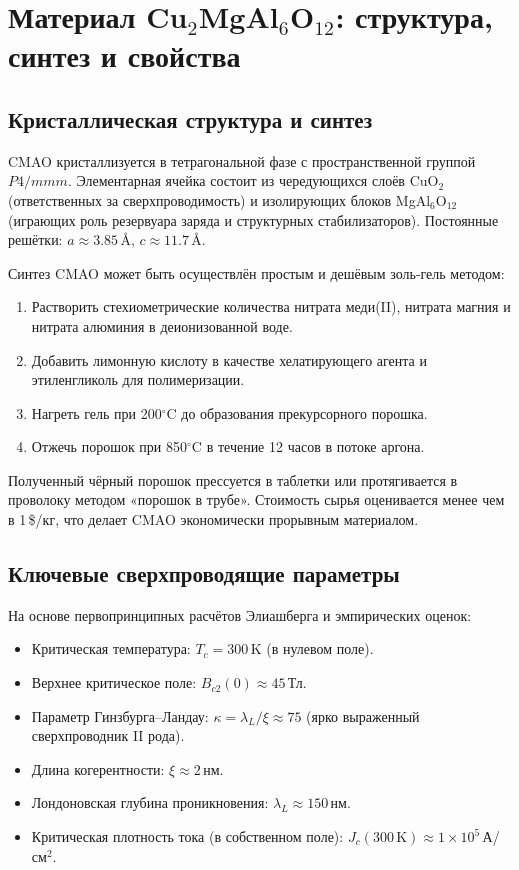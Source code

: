 \documentclass[12pt,a4paper]{article}
\numberwithin{equation}{section}
\begin{document}
\section{Материал Cu$_2$MgAl$_6$O$_{12}$: структура, синтез и свойства}
\label{sec:material}

\subsection{Кристаллическая структура и синтез}

CMAO кристаллизуется в тетрагональной фазе с пространственной группой $P4/mmm$. Элементарная ячейка состоит из чередующихся слоёв CuO$_2$ (ответственных за сверхпроводимость) и изолирующих блоков MgAl$_6$O$_{12}$ (играющих роль резервуара заряда и структурных стабилизаторов). Постоянные решётки: $a \approx 3.85$\,\AA, $c \approx 11.7$\,\AA.

Синтез CMAO может быть осуществлён простым и дешёвым золь-гель методом:
\begin{enumerate}
    \item Растворить стехиометрические количества нитрата меди(II), нитрата магния и нитрата алюминия в деионизованной воде.
    \item Добавить лимонную кислоту в качестве хелатирующего агента и этиленгликоль для полимеризации.
    \item Нагреть гель при 200$^\circ$C до образования прекурсорного порошка.
    \item Отжечь порошок при 850$^\circ$C в течение 12 часов в потоке аргона.
\end{enumerate}
Полученный чёрный порошок прессуется в таблетки или протягивается в проволоку методом «порошок в трубе». Стоимость сырья оценивается менее чем в 1\,\$/кг, что делает CMAO экономически прорывным материалом.

\subsection{Ключевые сверхпроводящие параметры}

На основе первопринципных расчётов Элиашберга и эмпирических оценок:
\begin{itemize}
    \item Критическая температура: $T_c = 300$\,K (в нулевом поле).
    \item Верхнее критическое поле: $B_{c2}(0) \approx 45$\,Тл.
    \item Параметр Гинзбурга--Ландау: $\kappa = \lambda_L/\xi \approx 75$ (ярко выраженный сверхпроводник II рода).
    \item Длина когерентности: $\xi \approx 2$\,нм.
    \item Лондоновская глубина проникновения: $\lambda_L \approx 150$\,нм.
    \item Критическая плотность тока (в собственном поле): $J_c(300\,\text{K}) \approx 1 \times 10^5$\,А/см$^2$.
\end{itemize}
\end{document}
